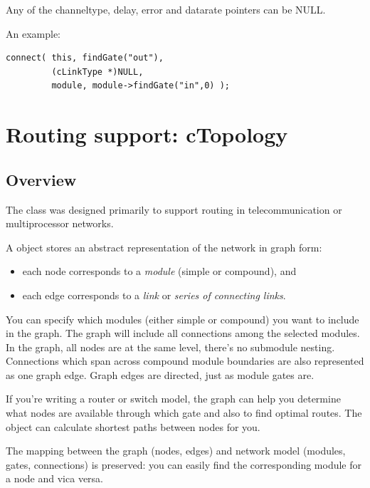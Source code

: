 Any of the channeltype, delay, error and datarate pointers can
be NULL.

An example:

\begin{verbatim}
connect( this, findGate("out"),
         (cLinkType *)NULL,
         module, module->findGate("in",0) );
\end{verbatim}





\section{Routing support: cTopology}

\subsection{Overview}

The  class was designed primarily to support
routing in telecommunication or multiprocessor
networks.

A  object stores an abstract representation of the
network in graph form:
\begin{itemize}
  \item{each  node corresponds to a \textit{module}
    (simple or compound), and}
  \item{each  edge corresponds to a \textit{link} or
    \textit{series of connecting links}.}
\end{itemize}

You can specify which modules (either simple or compound) you want to
include in the graph. The graph will include all connections among the
selected modules. In the graph, all nodes are at the same level,
there's no submodule nesting.  Connections which span across compound
module boundaries are also represented as one graph edge. Graph edges
are directed, just as module gates are.


If you're writing a router or switch model, the 
graph can help you determine what nodes are available through which
gate and also to find optimal routes. The
 object can calculate shortest paths between nodes for you.

The mapping between the graph (nodes, edges) and network model
(modules, gates, connections) is preserved: you can easily find
the corresponding module for a  node and vica versa.





